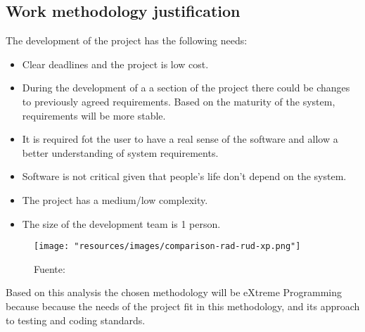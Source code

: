 \subsection{Work methodology justification}
\label{sec:methodology-justification}

The development of the project has the following needs:

\begin{itemize}
    \item Clear deadlines and the project is low cost.
    \item During the development of a a section of the project there could be changes to previously agreed requirements.
        Based on the maturity of the system, requirements will be more stable.
    \item It is required fot the  user to have a real sense of the software and allow a better understanding of system requirements.
    \item Software is not critical given that people's life don't depend on the system.
    \item The project has a medium/low complexity.
    \item The size of the development team is 1 person.
\end{itemize}

\begin{figure}
    \texttt{[image: "resources/images/comparison-rad-rud-xp.png"]}
    \caption{Fuente: \textcite{geambasu2011influence}}\label{fig:comparison-rad-rud-xp}
\end{figure}

Based on this analysis the chosen methodology will be eXtreme Programming because because the needs of the project fit in this methodology, and its approach to testing and coding standards.

